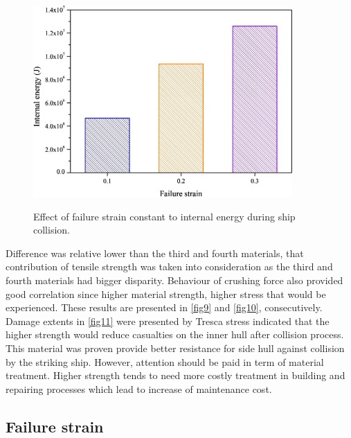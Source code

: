 \documentclass[../Final.tex]{subfiles}
\begin{document}
    
\begin{figure}[ht]
    \centering
    \includegraphics[width=\columnwidth]{fig12.jpg}
    \label{fig12}
    \caption{Effect of failure strain constant to internal energy during ship collision.}
\end{figure}

Difference was relative lower than the third and fourth materials, that contribution of tensile strength was taken into consideration as the third and fourth materials had bigger disparity. 
Behaviour of crushing force also provided good correlation since higher material strength, higher stress that would be experienced. These results are presented in \ref{fig9} and \ref{fig10}, consecutively. 
Damage extents in \ref{fig11} were presented by Tresca stress indicated that the higher strength would reduce casualties on the inner hull after collision process. 
This material was proven provide better resistance for side hull against collision by the striking ship. However, attention should be paid in term of material treatment. 
Higher strength tends to need more costly treatment in building and repairing processes which lead to increase of maintenance cost. 

\subsection{Failure strain}
\end{document}
